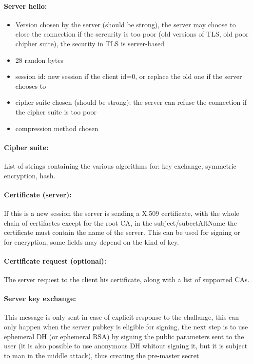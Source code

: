\documentclass[12pt]{article}
\begin{document}
\paragraph{Server hello:}
\begin{itemize}
  \item Version chosen by the server (should be strong), the server may choose to close the connection if the sercurity is too poor (old versions of TLS, old poor chipher suite), the security in TLS is server-based
  \item 28 randon bytes
  \item session id: new session if the client id=0, or replace the old one if the server chooses to
  \item cipher suite chosen (should be strong): the server can refuse the connection if the cipher suite is too poor
  \item compression method chosen
\end{itemize}

\paragraph{Cipher suite:}
List of strings containing the various algorithms for: key exchange, symmetric encryption, hash.

\paragraph{Certificate (server):}
If this is a new session the server is sending a X.509 certificate, with the whole chain of certifactes except for the root CA, in the subject/subectAltName the certificate must contain the name of the server. This can be used for signing or for encryption, some fields may depend on the kind of key.

\paragraph{Certificate request (optional): }
The server request to the client his certificate, along with a list of supported CAs.

\paragraph{Server key exchange:}
This message is only sent in case of explicit response to the challange, this can only happen when the server pubkey is eligible for signing, the next step is to use ephemeral DH (or ephemeral RSA) by signing the public parameters sent to the user (it is also possible to use anonymous DH whitout signing it, but it is subject to man in the middle attack), thus creating the pre-master secret
\end{document}
